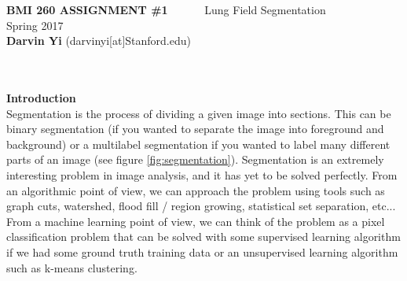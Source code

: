\documentclass[10pt]{article}
\begin{document}
\begin{center}
\LARGE
\textbf{BMI 260 ASSIGNMENT \#1} \ \ \ \textbar \ \ \ Lung Field Segmentation\\
\normalsize
Spring 2017\\
\textbf{Darvin Yi} (darvinyi[at]Stanford.edu)\\
\ \\
\ \\
\end{center}

\noindent \Large \textbf{Introduction} \normalsize \\
\noindent\makebox[\linewidth]{\rule{\textwidth}{0.4pt}}
Segmentation is the process of dividing a given image into sections.  This can be binary segmentation (if you wanted to separate the image into foreground and background) or a multilabel segmentation if you wanted to label many different parts of an image (see figure \ref{fig:segmentation}).  Segmentation is an extremely interesting problem in image analysis, and it has yet to be solved perfectly.  From an algorithmic point of view, we can approach the problem using tools such as graph cuts, watershed, flood fill / region growing, statistical set separation, etc... From a machine learning point of view, we can think of the problem as a pixel classification problem that can be solved with some supervised learning algorithm if we had some ground truth training data or an unsupervised learning algorithm such as k-means clustering.
\end{document}

